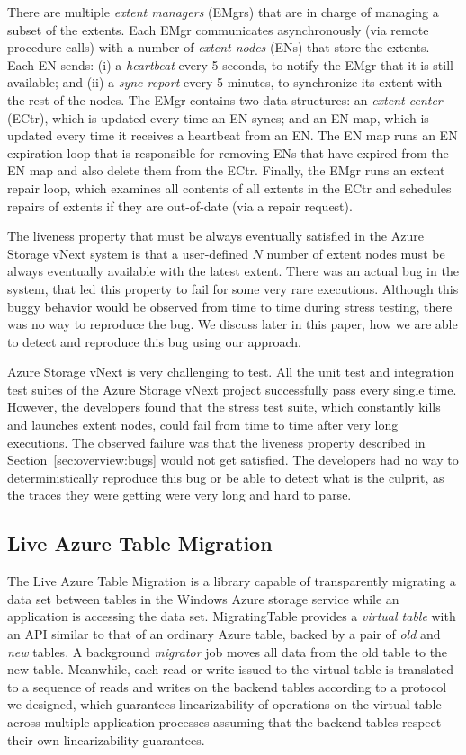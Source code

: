 There are multiple \emph{extent managers} (EMgrs) that are in charge of managing a subset of the extents. Each EMgr communicates asynchronously (via remote procedure calls) with a number of \emph{extent nodes} (ENs) that store the extents. Each EN sends: (i) a \emph{heartbeat} every 5 seconds, to notify the EMgr that it is still available; and (ii) a \emph{sync report} every 5 minutes, to synchronize its extent with the rest of the nodes. The EMgr contains two data structures: an \emph{extent center} (ECtr), which is updated every time an EN syncs; and an EN map, which is updated every time it receives a heartbeat from an EN. The EN map runs an EN expiration loop that is responsible for removing ENs that have expired from the EN map and also delete them from the ECtr. Finally, the EMgr runs an extent repair loop, which examines all contents of all extents in the ECtr and schedules repairs of extents if they are out-of-date (via a repair request).

The liveness property that must be always eventually satisfied in the Azure Storage vNext system is that a user-defined $N$ number of extent nodes must be always eventually available with the latest extent. There was an actual bug in the system, that led this property to fail for some very rare executions. Although this buggy behavior would be observed from time to time during stress testing, there was no way to reproduce the bug. We discuss later in this paper, how we are able to detect and reproduce this bug using our approach.

Azure Storage vNext is very challenging to test. All the unit test and integration test suites of the Azure Storage vNext project successfully pass every single time. However, the developers found that the stress test suite, which constantly kills and launches extent nodes, could fail from time to time after very long executions. The observed failure was that the liveness property described in Section~\ref{sec:overview:bugs} would not get satisfied. The developers had no way to deterministically reproduce this bug or be able to detect what is the culprit, as the traces they were getting were very long and hard to parse.

\subsection{Live Azure Table Migration}
\label{sec:cases:migration}

The Live Azure Table Migration is a library capable of transparently migrating a data set between tables in the Windows Azure storage service while an application is accessing the data set.  MigratingTable provides a \emph{virtual table} with an API similar to that of an ordinary Azure table, backed by a pair of \emph{old} and \emph{new}  tables.  A background \emph{migrator} job moves all data from the old table to the new table.  Meanwhile, each read or write issued to the virtual table is translated to a sequence of reads and writes on the backend tables according to a protocol we designed, which guarantees linearizability of operations on the virtual table across multiple application processes assuming that the backend tables respect their own linearizability guarantees.

